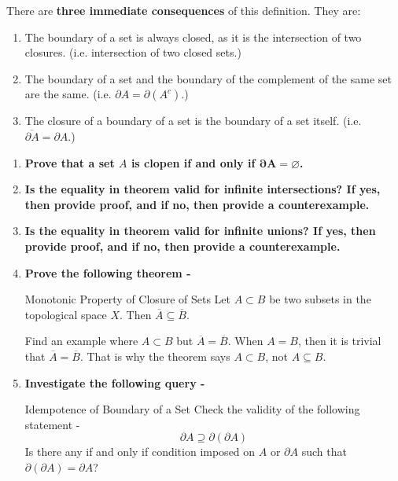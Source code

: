 \noindent There are \textbf{three immediate consequences} of this definition. They are:
\begin{enumerate}
    \item The boundary of a set is always closed, as it is the intersection of two closures. (i.e. intersection of two closed sets.)
    \item The boundary of a set and the boundary of the complement of the same set are the same. (i.e. $\partial A=\partial (A^c)$.)
    \item The closure of a boundary of a set is the boundary of a set itself. (i.e. $\overline{\partial A}=\partial A$.)
\end{enumerate}
\exercise
\begin{enumerate}[label=\textbf{\arabic*}.]
    \item \textbf{Prove that a set $A$ is clopen if and only if $\pmb{\partial A=\varnothing}$.}
    \item \textbf{Is the equality in theorem \pmb{\eqref{intersection_interior}} valid for infinite intersections? If yes, then provide proof, and if no, then provide a counterexample.}
    \item \textbf{Is the equality in theorem \pmb{\eqref{closure_union}} valid for infinite unions? If yes, then provide proof, and if no, then provide a counterexample.}
    \item \textbf{Prove the following theorem -}
    \begin{Theorem}{Monotonic Property of Closure of Sets}\label{monotonicity_of_closure}
        Let $A\subset B$ be two subsets in the topological space $X$. Then $\overline{A}\subseteq\overline{B}$.
    \end{Theorem}
    \noindent Find an example where $A\subset B$ but $\overline{A}=\overline{B}$. When $A=B$, then it is trivial that $\overline{A}=\overline{B}$. That is why the theorem says $A\subset B$, not $A\subseteq B$.
    \item \textbf{Investigate the following query -}
    \begin{Query}{Idempotence of Boundary of a Set}\label{idempotence_of_boundary}
        Check the validity of the following statement - $$\partial A\supseteq\partial(\partial A)$$
        Is there any if and only if condition imposed on $A$ or $\partial A$ such that $\partial(\partial A)=\partial A$?

\end{Query}
\end{enumerate}
